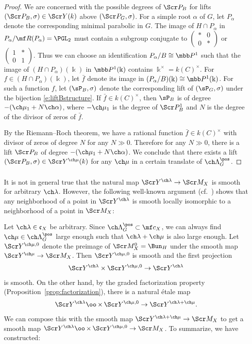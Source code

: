 \documentclass[final]{amsart}
\theoremstyle{remark}
\theoremstyle{definition}
\DeclareMathOperator*{\xt}{\times}
\numberwithin{equation}{section}
\begin{document}
\begin{proof}
We are concerned with the possible degrees of $\Scr P_B$ for 
lifts $(\Scr P_B,\sigma)\in \Scr Y(k)$ above $(\Scr P_G,\sigma)$.
For a simple root $\alpha$ of $G$, let $P_\alpha$ denote the corresponding minimal
parabolic in $G$. 
The image of $H\cap P_\alpha$ in $P_\alpha/\mf R(P_\alpha) = \PGL_2$ must contain 
a subgroup conjugate to $\left(\begin{smallmatrix} * & 0 \\ 0 & * \end{smallmatrix}\right)$
or $\left(\begin{smallmatrix} 1 & * \\ 0 & 1 \end{smallmatrix}\right)$.
Thus we can choose an identification $P_\alpha/B \cong \mbb P^1$ such that
the image of $(H\cap P_\alpha)(\Bbbk)$ in $\mbb P^1(\Bbbk)$ contains 
$\Bbbk^\times = k(C)^\times$. 
For $f \in (H\cap P_\alpha)(\Bbbk)$, let $\bar f$ denote its image in $(P_\alpha/B)(\Bbbk) \cong \mbb P^1(\Bbbk)$. 
For such a function $f$, let $(\sP_B,\sigma)$ denote the corresponding lift
of $(\sP_G,\sigma)$ under the bijection \eqref{e:liftBstructure}.
If $\bar f \in k(C)^\times$, then $\sP_B$ is of degree $-(\ch\mu_1 + N\ch\alpha)$, 
where $-\ch\mu_1$ is the degree of $\Scr P_B^1$ and 
$N$ is the degree of the divisor of zeros of $\bar f$.

By the Riemann--Roch theorem, we have a rational function $\bar f\in k(C)^\times$ 
with divisor of zeros of degree $N$ for any $N \gg 0$. 
Therefore for any $N\gg 0$, there is a lift $\Scr P_B$ of degree 
$-(\ch\mu_1+N\ch\alpha)$. 
We conclude that there exists a lift 
$(\Scr P_B,\sigma)\in \Scr Y^{\ch\mu}(k)$ for any $\ch\mu$ 
in a certain translate of $\ch\Lambda^\pos_G$.
\end{proof}


\subsubsection{} \label{sect:locglobyoga}
It is not in general true that the natural map 
$\Scr Y^{\ch\lambda} \to \Scr M_{X}$ is smooth for 
arbitrary $\ch\lambda$. However, the following 
well-known argument (cf.~\cite[Theorem 16.2.1]{GN}) 
shows that any neighborhood of a point in $\Scr Y^{\ch\lambda}$
is smooth locally isomorphic to a neighborhood of a point in 
$\Scr M_{X}$:

Let $\ch\lambda\in \mathfrak c_X$ be arbitrary. 
Since $\ch\Lambda^\pos_G \subset \mf c_X$, we can always
find $\ch\mu \in \ch\Lambda^\pos_G$ large enough such that 
$\ch\lambda+\ch\mu$ is also large enough. 
Let $\Scr Y^{\ch\mu,0}$ denote the preimage of $\Scr M_X^0=\Bun_H$ under the smooth map $\Scr Y^{\ch\mu} \to \Scr M_{X}$.
Then $\Scr Y^{\ch\mu,0}$ is smooth and   
the first projection
\[  \Scr Y^{\ch\lambda} \times \Scr Y^{\ch\mu,0} \to \Scr Y^{\ch\lambda} \]
is smooth.
On the other hand, by the graded factorization property (Proposition~\ref{prop:factorization}), there is a natural \'etale map 
\[ \Scr Y^{\ch\lambda} \oo\xt \Scr Y^{\ch\mu,0} 
\to \Scr Y^{\ch\lambda+\ch\mu}. 
\]
We can compose this with the smooth map $\Scr Y^{\ch\lambda+\ch\mu}\to \Scr M_X$ to get a smooth map $\Scr Y^{\ch\lambda} \oo\xt \Scr Y^{\ch\mu,0} \to \Scr M_X$.
To summarize, we have constructed:
\end{document}
